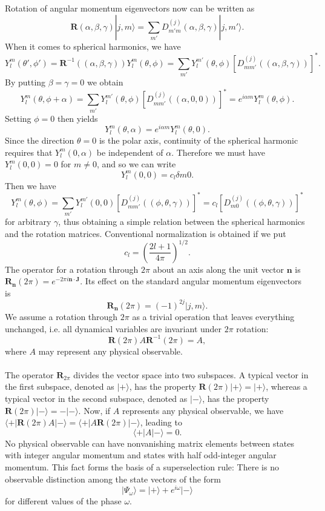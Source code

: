 \\ \\
Rotation of angular momentum eigenvectors now can be written as
\[\bm{R}(\alpha,\beta,\gamma)|j,m\rangle = \sum_{m'} D_{m'm}^{(j)}(\alpha,\beta,\gamma) |j,m'\rangle.\]
When it comes to spherical harmonics, we have
\[Y_l^m(\theta',\phi') = \bm{R}^{-1}((\alpha,\beta,\gamma)) Y_l^m(\theta,\phi) = \sum_{m'} Y_{l}^{m'}(\theta,\phi) [D_{mm'}^{(j)}((\alpha,\beta,\gamma))]^*.\]
By putting $\beta = \gamma = 0$ we obtain
\[Y_l^m(\theta,\phi+\alpha) = \sum_{m'} Y_{l}^{m'}(\theta,\phi) [D_{mm'}^{(j)}((\alpha,0,0))]^* = e^{i\alpha m} Y_{l}^{m}(\theta,\phi).\]
Setting $\phi=0$ then yields
\[Y_l^m(\theta,\alpha) = e^{i\alpha m} Y_{l}^{m}(\theta,0).\]
Since the direction $\theta = 0$ is the polar axis, continuity of the spherical harmonic requires that $Y_l^m(0,\alpha)$ be independent of $\alpha$. Therefore we must
have $Y_l^m(0,0) = 0$ for $m \neq 0$, and so we can write
\[Y_{l}^{m}(0,0) = c_{l}\delta{m0}.\]
Then we have
\[Y_l^m(\theta,\phi) = \sum_{m'} Y_{l}^{m'}(0,0) [D_{mm'}^{(j)}((\phi,\theta,\gamma))]^* = c_l [D_{m0}^{(j)}((\phi,\theta,\gamma))]^*\]
for arbitrary $\gamma$, thus obtaining a simple relation between the spherical harmonics and the rotation matrices. Conventional normalization is obtained if we put
\[c_l = \left( \frac{2l+1}{4\pi} \right) ^{1/2}.\]
The operator for a rotation through $2\pi$ about an axis
along the unit vector $\bm{n}$ is $\bm{R}_{\bm{n}}(2\pi) = e^{-2\pi i\bm{n}\cdot\bm{J}}$. Its effect on the standard angular momentum eigenvectors is
\[\bm{R}_{\bm{n}}(2\pi) = (-1)^{2j}|j,m\rangle .\]
We assume a rotation through $2\pi$ as a trivial operation that leaves everything unchanged, i.e. all dynamical variables are invariant under $2\pi$ rotation:
\[\bm{R}(2\pi) A \bm{R}^{-1}(2\pi) = A,\]
where $A$ may represent any physical observable. 
\\ \\
The operator $\bm{R}_{2\pi}$ divides the vector space into two subspaces. A typical vector in the first subspace,
denoted as $|+\rangle$, has the property $\bm{R}(2\pi)|+\rangle = |+\rangle$, whereas a typical vector in the second subspace, denoted as $|-\rangle$, has the property $\bm{R}(2\pi)|-\rangle = -|-\rangle$. Now, if $A$ represents any physical observable, we have $\langle + | \bm{R}(2\pi) A| - \rangle = \langle + | A\bm{R}(2\pi)| - \rangle$, leading to 
\[\langle + | A | - \rangle = 0.\]
No physical observable can have nonvanishing matrix elements between states with integer angular momentum and states with half odd-integer angular momentum. This fact forms the basis of a superselection rule: There is no observable distinction among the state vectors of the form
\[|\Psi_{\omega}\rangle = |+\rangle + e^{i\omega}|-\rangle\]
for different values of the phase $\omega$.


